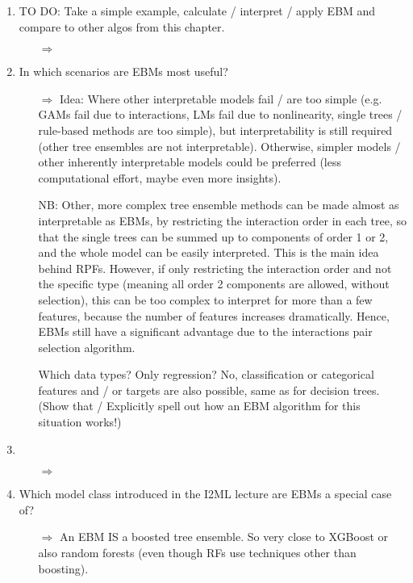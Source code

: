 \begin{enumerate}
        \item TO DO: Take a simple example, calculate / interpret / apply EBM and compare to other algos from this chapter.
        \begin{itemize}
            \item[$\Rightarrow$] 
        \end{itemize}

        \item In which scenarios are EBMs most useful?
        \begin{itemize}
            \item[$\Rightarrow$]
            Idea: Where other interpretable models fail / are too simple (e.g. GAMs fail due to interactions, LMs fail due to nonlinearity, single trees / rule-based methods are too simple), but interpretability is still required (other tree ensembles are not interpretable). Otherwise, simpler models / other inherently interpretable models could be preferred (less computational effort, maybe even more insights).

            NB: Other, more complex tree ensemble methods can be made almost as interpretable as EBMs, by restricting the interaction order in each tree, so that the single trees can be summed up to components of order 1 or 2, and the whole model can be easily interpreted.
            This is the main idea behind RPFs.
            However, if only restricting the interaction order and not the specific type (meaning all order 2 components are allowed, without selection), this can be too complex to interpret for more than a few features, because the number of features increases dramatically.
            Hence, EBMs still have a significant advantage due to the interactions pair selection algorithm.
            
            Which data types? Only regression? No, classification or categorical features and / or targets are also possible, same as for decision trees. (Show that / Explicitly spell out how an EBM algorithm for this situation works!)
        \end{itemize}

        \item 
        \begin{itemize}
            \item[$\Rightarrow$] 
        \end{itemize}

        \item Which model class introduced in the I2ML lecture are EBMs a special case of?
        \begin{itemize}
            \item[$\Rightarrow$] An EBM IS a boosted tree ensemble.
            So very close to XGBoost or also random forests (even though RFs use techniques other than boosting).
        \end{itemize}


\end{enumerate}
